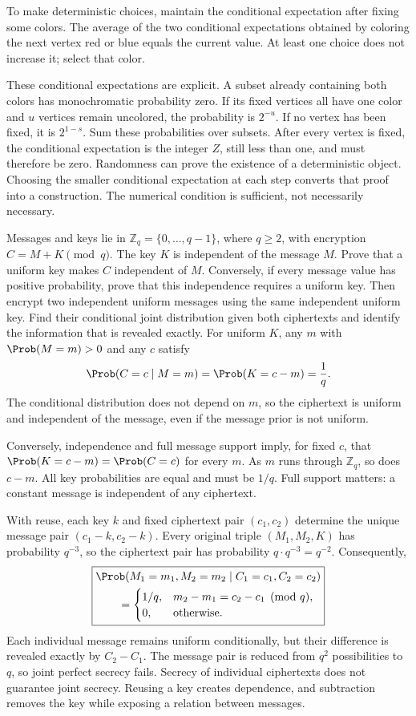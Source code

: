 To make deterministic choices, maintain the conditional expectation after fixing some colors. The average of the two conditional expectations obtained by coloring the next vertex red or blue equals the current value. At least one choice does not increase it; select that color.

These conditional expectations are explicit. A subset already containing both colors has monochromatic probability zero. If its fixed vertices all have one color and $u$ vertices remain uncolored, the probability is $2^{-u}$. If no vertex has been fixed, it is $2^{1-s}$. Sum these probabilities over subsets. After every vertex is fixed, the conditional expectation is the integer $Z$, still less than one, and must therefore be zero.
\insight Randomness can prove the existence of a deterministic object. Choosing the smaller conditional expectation at each step converts that proof into a construction. The numerical condition is sufficient, not necessarily necessary.

Messages and keys lie in $\mathbb Z_q=\{0,\ldots,q-1\}$, where $q\ge2$, with encryption $C=M+K\pmod q$. The key $K$ is independent of the message $M$. Prove that a uniform key makes $C$ independent of $M$. Conversely, if every message value has positive probability, prove that this independence requires a uniform key. Then encrypt two independent uniform messages using the same independent uniform key. Find their conditional joint distribution given both ciphertexts and identify the information that is revealed exactly.
\solution For uniform $K$, any $m$ with $\Prob(M=m)>0$ and any $c$ satisfy
\[
\Prob(C=c\mid M=m)=\Prob(K=c-m)=\frac1q.
\]
The conditional distribution does not depend on $m$, so the ciphertext is uniform and independent of the message, even if the message prior is not uniform.

Conversely, independence and full message support imply, for fixed $c$, that $\Prob(K=c-m)=\Prob(C=c)$ for every $m$. As $m$ runs through $\mathbb Z_q$, so does $c-m$. All key probabilities are equal and must be $1/q$. Full support matters: a constant message is independent of any ciphertext.

With reuse, each key $k$ and fixed ciphertext pair $(c_1,c_2)$ determine the unique message pair $(c_1-k,c_2-k)$. Every original triple $(M_1,M_2,K)$ has probability $q^{-3}$, so the ciphertext pair has probability $q\cdot q^{-3}=q^{-2}$. Consequently,
\[
\boxed{\begin{aligned}
&\Prob(M_1=m_1,M_2=m_2\mid C_1=c_1,C_2=c_2)\\
&\qquad=\begin{cases}
1/q,&m_2-m_1=c_2-c_1\pmod q,\\
0,&\text{otherwise}.
\end{cases}\end{aligned}}
\]
Each individual message remains uniform conditionally, but their difference is revealed exactly by $C_2-C_1$. The message pair is reduced from $q^2$ possibilities to $q$, so joint perfect secrecy fails.
\insight Secrecy of individual ciphertexts does not guarantee joint secrecy. Reusing a key creates dependence, and subtraction removes the key while exposing a relation between messages.
